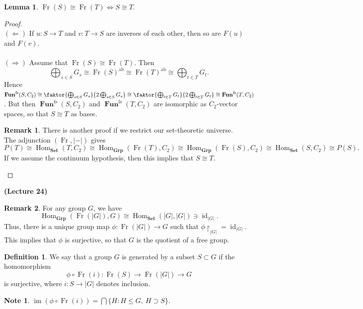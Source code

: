 \documentclass[10pt,letterpaper,cm]{nupset}
\theoremstyle{definition}
\newtheorem*{definition}{Definition}
\newtheorem{note}{Note}
\newtheorem{remark}{Remark}
\newtheorem{lemma}{Lemma}
\newcommand{\1}{\mathbf{1}}
\newcommand{\0}{\vec 0}
\DeclareMathOperator{\id}{id}
\DeclareMathOperator{\ab}{ab}
\DeclareMathOperator{\im}{im}
\DeclareMathOperator{\fs}{fs}
\DeclareMathOperator{\Hom}{Hom}
\DeclareMathOperator{\Fun}{\mathbf{Fun}}
\DeclareMathOperator{\Fr}{Fr}
\begin{document}
\begin{lemma}
$\Fr(S) \cong \Fr(T) \iff S\cong T.$ 
\end{lemma}
\begin{proof} $ $
\\ $(\Longleftarrow)$ If $u: S \to T$ and $v: T\to S$ are inverses of each other, then so are $F(u)$ and $F(v)$.
\\ \\
$(\Longrightarrow)$ Assume that $\Fr(S) \cong \Fr(T)$. Then $$\bigoplus_{s\in S} G_s \cong \Fr(S)^{\ab} \cong \Fr(T)^{\ab} \cong \bigoplus_{t\in T} G_t.$$ Hence $\Fun^{\fs}(S, C_2)\cong \faktor{\bigoplus_{s\in S} G_s}{2\bigoplus_{s\in S} G_s} \cong \faktor{\bigoplus_{t\in T} G_t}{2\bigoplus_{t\in T} G_t}\cong \Fun^{\fs}(T, C_2)$. But then $\Fun^{\fs}(S, C_2)$ and  $\Fun^{\fs}(T, C_2)$ are isomorphic as $C_2$-vector spaces, so that $S \cong T$ as bases. 
\begin{remark} There is another proof if we restrict our set-theoretic universe.
\\
The adjunction $(\Fr, \lvert - \rvert)$ gives $$P(T) \cong \Hom_{\mathbf{Set}}(T, C_2) \cong \Hom_{\mathbf{Grp}}(\Fr(T), C_2)\cong \Hom_{\mathbf{Grp}}(\Fr(S), C_2)\cong \Hom_{\mathbf{Set}}(S, C_2)\cong P(S).$$
If we assume the continuum hypothesis, then this implies that $S \cong T$.
\end{remark}
\end{proof}

\begin{center}
{\textbf{(Lecture 24)}}
\end{center}

\begin{remark}
For any group $G$, we have $$\Hom_{\mathbf{Grp}}(\Fr(|G|), G) \cong \Hom_{\mathbf{Set}}(|G|, |G|)\ni \id_{|G|}.$$ Thus, there is a unique group map $\phi : \Fr(|G|) \to G$ such that $\phi \restriction_{|G|} = \id_{|G|}$. This implies that $\phi$ is surjective, so that $G$ is the quotient of a free group.
\end{remark}

\begin{definition}
We say that a group $G$ is generated by a subset $S\subset G$ if the homomorphism $$\phi \circ \Fr(i):\Fr(S) \to \Fr(|G|) \to G$$ is surjective, where $i: S \to |G|$ denotes inclusion.
\end{definition}

\begin{note}
$\im(\phi \circ \Fr(i)) = \bigcap \{H : H \leq G, \ H \supset S\}$.
\end{note}
\end{document}
